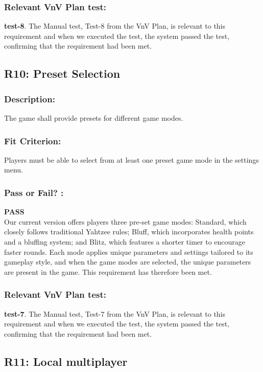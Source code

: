 \documentclass[12pt, titlepage]{article}
\begin{document}
\subsubsection*{Relevant VnV Plan test: } \textbf{test-8}.  The Manual test, Test-8 from the VnV Plan, is relevant to this requirement and when we executed the test, the system passed the test, confirming that the requirement had been met.


\subsection{R10: Preset Selection} 
\label{R10} 

\subsubsection*{Description:}The game shall provide presets for different game modes.

\subsubsection*{Fit Criterion:}Players must be able to select from at least one preset game mode in the settings menu.

\subsubsection*{Pass or Fail? :} 

 \noindent \textbf{PASS}\\
 
  Our current version offers players three pre-set game modes: Standard, which closely follows traditional Yahtzee rules; Bluff, which incorporates health points and a bluffing system; and Blitz, which features a shorter timer to encourage faster rounds. Each mode applies unique parameters and settings tailored to its gameplay style, and when the game modes are selected, the unique parameters are present in the game. This requirement has therefore been met.

\subsubsection*{Relevant VnV Plan test: } \textbf{test-7}.  The Manual test, Test-7 from the VnV Plan, is relevant to this requirement and when we executed the test, the system passed the test, confirming that the requirement had been met.


\subsection{R11: Local multiplayer} 
\label{R11} 
\end{document}
